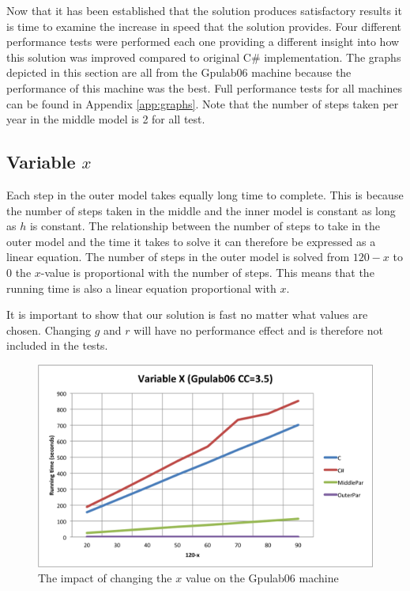 
Now that it has been established that the solution produces satisfactory results it is time to examine the increase in speed that the solution provides. Four different performance tests were performed each one providing a different insight into how this solution was improved compared to original C\# implementation. The graphs depicted in this section are all from the Gpulab06 machine because the performance of this machine was the best. Full performance tests for all machines can be found in Appendix \ref{app:graphs}. Note that the number of steps taken per year in the middle model is 2 for all test.\\

\subsection{Variable $x$}

Each step in the outer model takes equally long time to complete. This is because the number of steps taken in the middle and the inner model is constant as long as $h$ is constant. 
The relationship between the number of steps to take in the outer model and the time it takes to solve it can therefore be expressed as a linear equation. 
The number of steps in the outer model is solved from $120-x$ to 0 the $x$-value is proportional with the number of steps. This means that the running time is also a linear equation proportional with $x$.

It is important to show that our solution is fast no matter what values are chosen. Changing $g$ and $r$ will have no performance effect and is therefore not included in the tests.

\begin{figure}[t]
\begin{center}
	\includegraphics[scale=0.5]{img/Gpulab-varx35.png}
\end{center}
\caption{The impact of changing the $x$ value on the Gpulab06 machine}
\label{variablex}
\end{figure}

